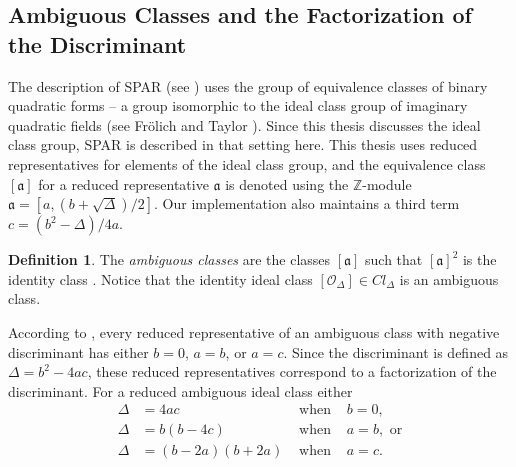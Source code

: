 \documentclass{ucalgthes1}
\theoremstyle{definition}
\newtheorem{defn}[thm]{Definition}
\newcommand{\ZZ}{\mathbb{Z}}
\begin{document}
\subsection{Ambiguous Classes and the Factorization of the Discriminant}
\label{subsec:forms}


The description of SPAR (see \cite{Schnorr1984}) uses the group of equivalence classes of binary quadratic forms -- a group isomorphic to the ideal class group of imaginary quadratic fields (see Fr{\"o}lich and Taylor \cite{Frolich1993}).  Since this thesis discusses the ideal class group, SPAR is described in that setting here.  This thesis uses reduced representatives for elements of the ideal class group, and the equivalence class $[\mathfrak a]$ for a reduced representative $\mathfrak a$ is denoted using the $\ZZ$\mbox{-}module $\mathfrak a = [a, (b + \sqrt\Delta)/2]$.  Our implementation also maintains a third term $c = (b^2 - \Delta)/4a$.

\begin{defn}
The \emph{ambiguous classes} are the classes $[\mathfrak a]$ such that ${[\mathfrak a]}^2$ is the identity class \cite[p.302]{Schnorr1984}.  Notice that the identity ideal class $[\mathcal O_\Delta] \in Cl_\Delta$ is an ambiguous class.
\end{defn}

According to \cite[p.303]{Schnorr1984}, every reduced representative of an ambiguous class with negative discriminant has either $b = 0$, $a = b$, or $a = c$.  Since the discriminant is defined as $\Delta = b^2 - 4ac$, these reduced representatives correspond to a factorization of the discriminant.  For a reduced ambiguous ideal class either
\begin{align*}
	\Delta &= 4ac & \textrm{ when } & b = 0, \\
	\Delta &= b(b-4c) & \textrm{ when } & a = b, \textrm{ or} \\
	\Delta &= (b - 2a)(b + 2a) & \textrm{ when } & a = c.
\end{align*}
\end{document}
